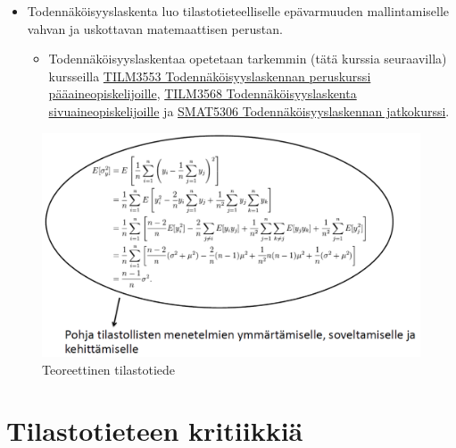 \documentclass[
]{book}
\providecommand{\tightlist}{%
  \setlength{\itemsep}{0pt}\setlength{\parskip}{0pt}}
\begin{document}
\begin{itemize}
\tightlist
\item
  Todennäköisyyslaskenta luo tilastotieteelliselle epävarmuuden mallintamiselle vahvan ja uskottavan matemaattisen perustan.

  \begin{itemize}
  \tightlist
  \item
    Todennäköisyyslaskentaa opetetaan tarkemmin (tätä kurssia seuraavilla) kursseilla \href{https://opas.peppi.utu.fi/fi/opintojakso/TILM3553/1734}{TILM3553 Todennäköisyyslaskennan peruskurssi pääaineopiskelijoille}, \href{https://opas.peppi.utu.fi/fi/opintojakso/TILM3568/3385}{TILM3568 Todennäköisyyslaskenta sivuaineopiskelijoille} ja \href{https://opas.peppi.utu.fi/fi/opintojakso/SMAT5306/4400}{SMAT5306 Todennäköisyyslaskennan jatkokurssi}.
  \end{itemize}
\end{itemize}

\begin{figure}

{\centering \includegraphics[width=1\linewidth]{images/teoreettinen} 

}

\caption{Teoreettinen tilastotiede}\label{fig:teoreettinen}
\end{figure}

\hypertarget{alaluku35}{%
\section{Tilastotieteen kritiikkiä}\label{alaluku35}}
\end{document}
